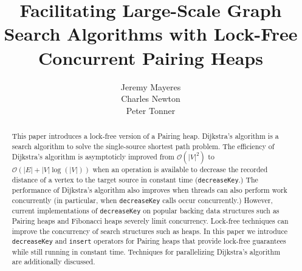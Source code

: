 \documentclass{acm_proc_article-sp}
\title{Facilitating Large-Scale Graph Search Algorithms with Lock-Free Concurrent Pairing Heaps}
\author{
\alignauthor
Jeremy Mayeres \\
\email{jeremym@knights.ucf.edu}
%
\alignauthor
Charles Newton \\
\email{newton@knights.ucf.edu}
%
\alignauthor
Peter Tonner \\
\email{ptonner@knights.ucf.edu}
}
\begin{document}
\maketitle
\begin{abstract}
This paper introduces a lock-free version of a Pairing heap.
Dijkstra's algorithm is a search algorithm to solve
the single-source shortest path problem. The efficiency
of Dijkstra's algorithm is asymptoticly improved
from $\mathcal{O}(|V|^2)$ to $\mathcal{O}(|E| + |V|\log(|V|))$ when
an operation is available to decrease the recorded distance of a vertex
to the target source in constant time (\texttt{decreaseKey}.)
The performance of Dijkstra's algorithm
also improves when threads can also perform work concurrently (in particular, when
\texttt{decreaseKey} calls occur concurrently.) However, current implementations of
\texttt{decreaseKey} on popular backing data structures such as Pairing heaps and Fibonacci heaps
severely limit concurrency. Lock-free techniques can improve the concurrency of search structures
such as heaps. In this paper we introduce \texttt{decreaseKey} and \texttt{insert}
operators for Pairing heaps that provide lock-free guarantees while still running in constant time.
Techniques for parallelizing Dijkstra's algorithm are additionally discussed.


\end{abstract}



\end{document}
